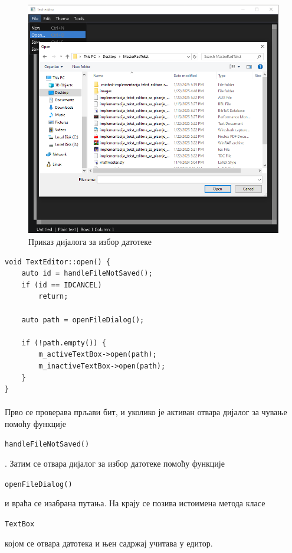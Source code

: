 \documentclass[12pt,oneside]{memoir}
\begin{document}
\begin{figure}[!ht]
	\centering
	\includegraphics[width=1.0\textwidth]{images/file_dialog.png}
	\caption{Приказ дијалога за избор датотеке}
	\label{fig:file_dialog}
\end{figure}

\begin{verbatim}
void TextEditor::open() {
	auto id = handleFileNotSaved();
	if (id == IDCANCEL)
		return;
	
	auto path = openFileDialog();
	
	if (!path.empty()) {
		m_activeTextBox->open(path);
		m_inactiveTextBox->open(path);
	}
}
\end{verbatim}

\paragraph{}
Прво се проверава прљави бит, и уколико је активан отвара дијалог за чување помоћу
функције \begin{latinica}\verb|handleFileNotSaved()|\end{latinica}. Затим се 
отвара дијалог за избор датотеке помоћу функције
\begin{latinica}\verb|openFileDialog()|\end{latinica}  и враћа се изабрана
путања. На крају се позива истоимена метода класе
\begin{latinica}\verb|TextBox|\end{latinica} којом се отвара датотека и њен садржај
учитава у едитор.
\end{document}
